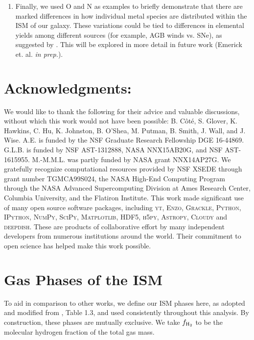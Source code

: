 \documentclass[fleqn,usenatbib,useAMS]{mnras}
\begin{document}
\begin{enumerate}
\item Finally, we used O and N as examples to briefly demonstrate that there are marked differences in how individual metal species are distributed within the ISM of our galaxy. These variations could be tied to differences in elemental yields among different sources (for example, AGB winds vs. SNe), as suggested by \cite{KrumholzTing2018}. This will be explored in more detail in future work (Emerick et. al. \textit{in prep.}).
\end{enumerate}

\section*{Acknowledgments:} 
We would like to thank the following for their advice and valuable discussions, without which this work would not have been possible: B. C\^ot\'e, S. Glover, K. Hawkins, C. Hu, K. Johnston, B. O'Shea, M. Putman, B. Smith, J. Wall, and J. Wise. A.E. is funded by the NSF Graduate Research Fellowship DGE 16-44869. G.L.B. is funded by NSF AST-1312888, NASA NNX15AB20G, and NSF AST-1615955. M.-M.M.L. was partly funded by NASA  grant NNX14AP27G. We gratefully recognize computational resources provided by NSF XSEDE through grant number TGMCA99S024, the NASA High-End Computing 
Program through the NASA Advanced Supercomputing 
Division at Ames Research Center, Columbia University, and the Flatiron Institute. This work made significant use of many open source software packages, including \textsc{yt}, \textsc{Enzo}, \textsc{Grackle}, \textsc{Python}, \textsc{IPython}, \textsc{NumPy}, \textsc{SciPy}, \textsc{Matplotlib}, \textsc{HDF5}, \textsc{h5py}, \textsc{Astropy}, \textsc{Cloudy} and \textsc{deepdish}. These are products of collaborative effort by many independent developers from numerous institutions around the world. Their commitment to open science has helped make this work possible. 

%



\appendix
\renewcommand\thefigure{\thesection.\arabic{figure}}    
\setcounter{figure}{0}

\section{Gas Phases of the ISM}
\label{appendix:phases}

To aid in comparison to other works, we define our ISM phases here, as adopted and modified from \citet{Draine2011}, Table 1.3, and used consistently throughout this analysis. By construction, these phases are mutually exclusive. We take $f_{\rm H_2}$ to be the molecular hydrogen fraction of the total gas mass.
\end{document}
